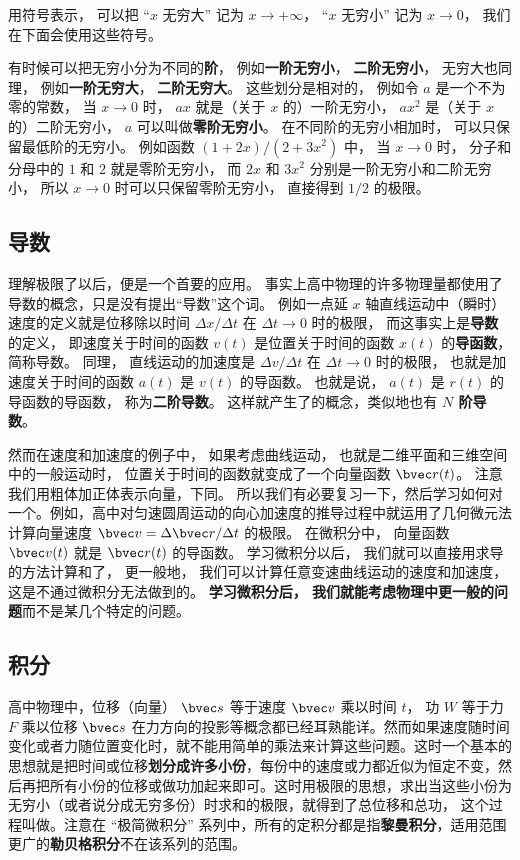 用符号表示， 可以把 “$x$ 无穷大” 记为 $x \to +\infty$， “$x$ 无穷小” 记为 $x \to 0$， 我们在下面会使用这些符号。

有时候可以把无穷小分为不同的\textbf{阶}， 例如\textbf{一阶无穷小}， \textbf{二阶无穷小}， 无穷大也同理， 例如\textbf{一阶无穷大}， \textbf{二阶无穷大}。 这些划分是相对的， 例如令 $a$ 是一个不为零的常数， 当 $x \to 0$ 时， $a x$ 就是（关于 $x$ 的）一阶无穷小， $a x^2$ 是（关于 $x$ 的）二阶无穷小， $a$ 可以叫做\textbf{零阶无穷小}。 在不同阶的无穷小相加时， 可以只保留最低阶的无穷小。 例如函数 $(1+2x)/(2+3x^2)$ 中， 当 $x\to 0$ 时， 分子和分母中的 $1$ 和 $2$ 就是零阶无穷小， 而 $2x$ 和 $3x^2$ 分别是一阶无穷小和二阶无穷小， 所以 $x\to 0$ 时可以只保留零阶无穷小， 直接得到 $1/2$ 的极限。

\subsection{导数}
理解极限了以后，便是一个首要的应用。 事实上高中物理的许多物理量都使用了导数的概念，只是没有提出“导数”这个词。 例如一点延 $x$ 轴直线运动中（瞬时）速度的定义就是位移除以时间 $\Delta x/\Delta t$ 在 $\Delta t \to 0$ 时的极限， 而这事实上是\textbf{导数}的定义， 即速度关于时间的函数 $v(t)$ 是位置关于时间的函数 $x(t)$ 的\textbf{导函数}， 简称导数。 同理， 直线运动的加速度是 $\Delta v/\Delta t$ 在 $\Delta t \to 0$ 时的极限， 也就是加速度关于时间的函数 $a(t)$ 是 $v(t)$ 的导函数。 也就是说， $a(t)$ 是 $r(t)$ 的导函数的导函数， 称为\textbf{二阶导数}。 这样就产生了的概念，类似地也有 \textbf{$N$ 阶导数}。

然而在速度和加速度的例子中， 如果考虑曲线运动， 也就是二维平面和三维空间中的一般运动时， 位置关于时间的函数就变成了一个向量函数 $\bvec r(t)$。 注意我们用粗体加正体表示向量，下同。 所以我们有必要复习一下，然后学习如何对一个。例如，高中对匀速圆周运动的向心加速度的推导过程中就运用了几何微元法计算向量速度 $\bvec v = \Delta \bvec r/\Delta t$ 的极限。 在微积分中， 向量函数 $\bvec v(t)$ 就是 $\bvec r(t)$ 的导函数。 学习微积分以后， 我们就可以直接用求导的方法计算和了， 更一般地， 我们可以计算任意变速曲线运动的速度和加速度， 这是不通过微积分无法做到的。 \textbf{学习微积分后， 我们就能考虑物理中更一般的问题}而不是某几个特定的问题。


\subsection{积分}
高中物理中，位移（向量） $\bvec s$ 等于速度 $\bvec v$ 乘以时间 $t$， 功 $W$ 等于力 $F$ 乘以位移 $\bvec s$ 在力方向的投影等概念都已经耳熟能详。然而如果速度随时间变化或者力随位置变化时，就不能用简单的乘法来计算这些问题。这时一个基本的思想就是把时间或位移\textbf{划分成许多小份}，每份中的速度或力都近似为恒定不变，然后再把所有小份的位移或做功加起来即可。这时用极限的思想，求出当这些小份为无穷小（或者说分成无穷多份）时求和的极限，就得到了总位移和总功， 这个过程叫做。注意在 “极简微积分” 系列中，所有的定积分都是指\textbf{黎曼积分}，适用范围更广的\textbf{勒贝格积分}不在该系列的范围。 %

